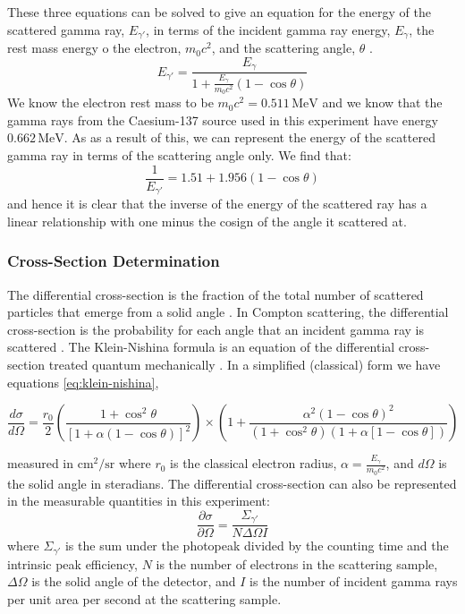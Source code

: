 \documentclass[%
reprint,
amsmath,amssymb,
aps,
floatfix
]{revtex4-2}
\begin{document}
			These three equations can be solved to give an equation for the energy of the scattered gamma ray, $E_{\gamma'}$, in terms of the incident gamma ray energy, $E_\gamma$, the rest mass energy o the electron, $m_0 c^2$, and the scattering angle, $\theta$ \cite{manual1}.
			\begin{equation}
				E_{\gamma'} = \frac{E_\gamma}{1 + \frac{E_\gamma}{m_0 c^2} \left( 1 - \cos{\theta} \right)}
			\end{equation}We know the electron rest mass to be $m_0 c^2 = 0.511 \,\text{MeV}$ and we know that the gamma rays from the Caesium-137 source used in this experiment have energy $0.662 \,\text{MeV}$. As as a result of this, we can represent the energy of the scattered gamma ray in terms of the scattering angle only. We find that:
			\begin{equation}
				\frac{1}{E_{\gamma'}} = 1.51 + 1.956 \left( 1 - \cos{\theta} \right)
				\label{eq:inverseGammaEnergyTheory}
			\end{equation}and hence it is clear that the inverse of the energy of the scattered ray has a linear relationship with one minus the cosign of the angle it scattered at.\\
			
			\subsubsection{Cross-Section Determination}
			The differential cross-section is the fraction of the total number of scattered particles that emerge from a solid angle \cite{fowler}. In Compton scattering, the differential cross-section is the probability for each angle that an incident gamma ray is scattered \cite{manual1}. The Klein-Nishina formula is an equation of the differential cross-section treated quantum mechanically \cite{yazaki}. In a simplified (classical) form we have equations \ref{eq:klein-nishina},
			\begin{widetext}
			\begin{equation}
				\frac{d\sigma}{d\Omega} = \frac{r_0}{2}\left( \frac{1 + \cos^2 \theta}{\left[1 + \alpha (1-\cos\theta)\right]^2} \right) \times \left( 1 + \frac{\alpha^2 (1-\cos\theta)^2}{(1 + \cos^2 \theta)(1 + \alpha[1 - \cos\theta])} \right)
				\label{eq:klein-nishina}
			\end{equation}
			\end{widetext}measured in $\text{cm}^2 / \text{sr}$ where $r_0$ is the classical electron radius, $\alpha = \frac{E_\gamma}{m_0 c^2}$, and $d\Omega$ is the solid angle in steradians. The differential cross-section can also be represented in the measurable quantities in this experiment:
			\begin{equation}
				\frac{\partial \sigma}{\partial \Omega} = \frac{\Sigma_{\gamma'}}{N \Delta \Omega I}
			\end{equation}where $\Sigma_{\gamma'}$ is the sum under the photopeak divided by the counting time and the intrinsic peak efficiency, $N$ is the number of electrons in the scattering sample, $\Delta \Omega$ is the solid angle of the detector, and $I$ is the number of incident gamma rays per unit area per second at the scattering sample.\\
			
\end{document}
